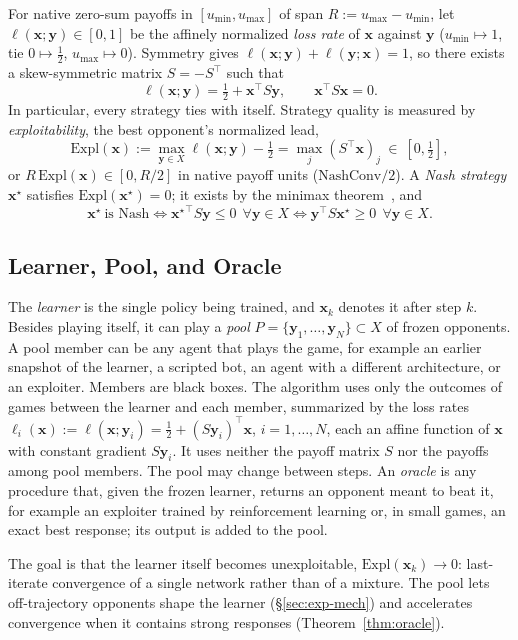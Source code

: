 \documentclass{article} %
\theoremstyle{plain}
\theoremstyle{remark}
\newcommand{\Expl}{\mathrm{Expl}}
\newcommand{\bx}{{\bm{x}}}
\newcommand{\by}{{\bm{y}}}
\newcommand{\xs}{\bx^{\star}}
\begin{document}
For native zero-sum payoffs in $[u_{\min},u_{\max}]$ of span $R:=u_{\max}-u_{\min}$, let $\ell(\bx;\by)\in[0,1]$ be the affinely normalized \emph{loss rate} of $\bx$ against $\by$ ($u_{\min}\mapsto1$, tie $0\mapsto\tfrac12$, $u_{\max}\mapsto0$). Symmetry gives $\ell(\bx;\by)+\ell(\by;\bx)=1$, so there exists a skew-symmetric matrix $S=-S^\top$ such that
\[
\ell(\bx;\by)=\tfrac12+\bx^\top S\by,\qquad \bx^\top S\bx=0 .
\]
In particular, every strategy ties with itself. Strategy quality is measured by \emph{exploitability}, the best opponent's normalized lead,
\[
\Expl(\bx):=\max_{\by\in X}\ell(\bx;\by)-\tfrac12=\max_j(S^\top \bx)_j\ \in\ [0,\tfrac12] ,
\]
or $R\,\Expl(\bx)\in[0,R/2]$ in native payoff units ($\mathrm{NashConv}/2$). A \emph{Nash strategy} $\xs$ satisfies $\Expl(\xs)=0$; it exists by the minimax theorem~\citep{vonneumann1928}, and
\begin{equation}
\xs\ \text{is Nash}\iff {\xs}^\top S\by\le0\ \ \forall \by\in X\iff \by^\top S\xs\ge0\ \ \forall \by\in X .
\label{eq:nash}
\end{equation}

\subsection{Learner, Pool, and Oracle}
\label{sec:setting}

The \emph{learner} is the single policy being trained, and $\bx_k$ denotes it after step $k$. Besides playing itself, it can play a \emph{pool} $P=\{\by_1,\dots,\by_N\}\subset X$ of frozen opponents. A pool member can be any agent that plays the game, for example an earlier snapshot of the learner, a scripted bot, an agent with a different architecture, or an exploiter. Members are black boxes. The algorithm uses only the outcomes of games between the learner and each member, summarized by the loss rates $\ell_i(\bx):=\ell(\bx;\by_i)=\tfrac12+(S\by_i)^\top\bx$, $i=1,\dots,N$, each an affine function of $\bx$ with constant gradient $S\by_i$. It uses neither the payoff matrix $S$ nor the payoffs among pool members. The pool may change between steps. An \emph{oracle} is any procedure that, given the frozen learner, returns an opponent meant to beat it, for example an exploiter trained by reinforcement learning or, in small games, an exact best response; its output is added to the pool.

The goal is that the learner itself becomes unexploitable, $\Expl(\bx_k)\to0$: last-iterate convergence of a single network rather than of a mixture. The pool lets off-trajectory opponents shape the learner (\S\ref{sec:exp-mech}) and accelerates convergence when it contains strong responses (Theorem~\ref{thm:oracle}).
\end{document}
